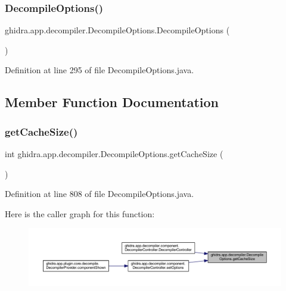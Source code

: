 \subsubsection{\texorpdfstring{DecompileOptions()}{DecompileOptions()}}
{\footnotesize\ttfamily ghidra.\+app.\+decompiler.\+Decompile\+Options.\+Decompile\+Options (\begin{DoxyParamCaption}{ }\end{DoxyParamCaption})\hspace{0.3cm}{\ttfamily [inline]}}



Definition at line 295 of file Decompile\+Options.\+java.



\subsection{Member Function Documentation}
\mbox{\label{classghidra_1_1app_1_1decompiler_1_1_decompile_options_a9ba66ce988f907c50bef0a1798435649}} 
\subsubsection{\texorpdfstring{getCacheSize()}{getCacheSize()}}
{\footnotesize\ttfamily int ghidra.\+app.\+decompiler.\+Decompile\+Options.\+get\+Cache\+Size (\begin{DoxyParamCaption}{ }\end{DoxyParamCaption})\hspace{0.3cm}{\ttfamily [inline]}}



Definition at line 808 of file Decompile\+Options.\+java.

Here is the caller graph for this function\+:
\nopagebreak
\begin{figure}[H]
\begin{center}
\leavevmode
\includegraphics[width=350pt]{classghidra_1_1app_1_1decompiler_1_1_decompile_options_a9ba66ce988f907c50bef0a1798435649_icgraph}
\end{center}
\end{figure}
\mbox{\label{classghidra_1_1app_1_1decompiler_1_1_decompile_options_ab805f3b221d2808b74624db5f2b7a74f}} 
